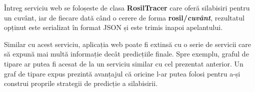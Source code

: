 Întreg serviciu web se foloșeste de clasa \textbf{RosilTracer} care oferă silabisiri pentru un cuvânt, iar de fiecare dată când o cerere de forma \textbf{rosil/\textit{cuvânt}}, rezultatul opținut este serializat în format JSON și este trimis inapoi apelantului.

Similar cu acest serviciu, aplicația web poate fi extinsă cu o serie de servicii care să expună mai multă informație decât predicțiile finale. Spre exemplu, graful de tipare ar putea fi acesat de la un serviciu similar cu cel prezentat anterior. Un graf de tipare expus prezintă avanțajul că oricine l-ar putea folosi pentru a-și construi proprile strategii de predicție a silabisirii. 